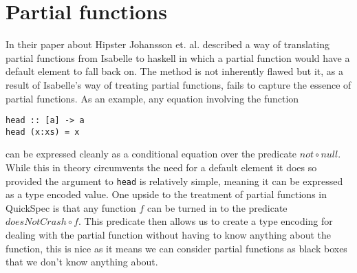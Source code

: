 \section{Partial functions}
In their paper about Hipster Johansson et. al. 
described a way of translating partial functions from
Isabelle to haskell in which a partial function would
have a default element to fall back on. The method is
not inherently flawed but it, as a result of Isabelle's
way of treating partial functions,
fails to capture the essence of partial functions.
As an example, any equation involving the function
\begin{verbatim}head :: [a] -> a
head (x:xs) = x
\end{verbatim}
can be expressed cleanly as a conditional equation
over the predicate $not\circ null$.
While this in theory circumvents the need for
a default element it does so provided the
argument to \texttt{head} is relatively simple,
meaning it can be expressed as a type encoded value.
One upside to the treatment of partial functions in QuickSpec
is that any function $f$ can be turned in to the predicate
$doesNotCrash \circ f$. This predicate then allows us to create
a type encoding for dealing with the partial function without
having to know anything about the function, this is nice as it means
we can consider partial functions as black boxes that we don't know anything about.
